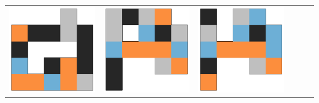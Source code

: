 \begin{tabular}{cccccc}
    \includegraphics[scale=0.1]{images/top_designs/walker/ga/ga5_gen29_ind3} &
    \includegraphics[scale=0.1]{images/top_designs/walker/ga/ga5_gen29_ind4} &
    \includegraphics[scale=0.1]{images/top_designs/walker/ga/ga5_gen29_ind5}\\

\end{tabular}
